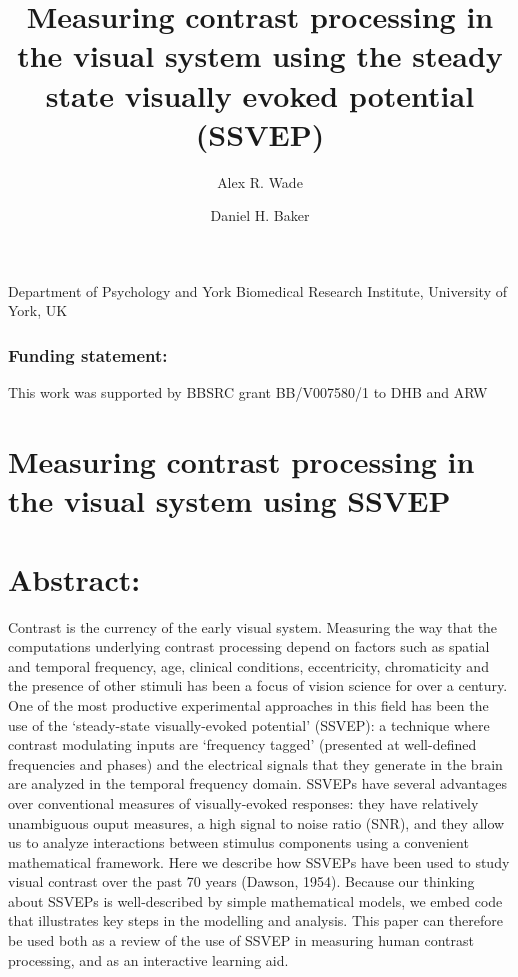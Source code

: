 \documentclass[
  letterpaper,
  DIV=11,
  numbers=noendperiod]{scrartcl}
\title{Measuring contrast processing in the visual system using the
steady state visually evoked potential (SSVEP)}
\author{Alex R. Wade \and Daniel H. Baker}
\date{}
\begin{document}
\maketitle

Department of Psychology and York Biomedical Research Institute,
University of York, UK

\subsubsection{Funding statement:}\label{funding-statement}

This work was supported by BBSRC grant BB/V007580/1 to DHB and ARW

\newpage{}

\section{Measuring contrast processing in the visual system using
SSVEP}\label{measuring-contrast-processing-in-the-visual-system-using-ssvep}

\section{Abstract:}\label{abstract}

Contrast is the currency of the early visual system. Measuring the way
that the computations underlying contrast processing depend on factors
such as spatial and temporal frequency, age, clinical conditions,
eccentricity, chromaticity and the presence of other stimuli has been a
focus of vision science for over a century. One of the most productive
experimental approaches in this field has been the use of the
`steady-state visually-evoked potential' (SSVEP): a technique where
contrast modulating inputs are `frequency tagged' (presented at
well-defined frequencies and phases) and the electrical signals that
they generate in the brain are analyzed in the temporal frequency
domain. SSVEPs have several advantages over conventional measures of
visually-evoked responses: they have relatively unambiguous ouput
measures, a high signal to noise ratio (SNR), and they allow us to
analyze interactions between stimulus components using a convenient
mathematical framework. Here we describe how SSVEPs have been used to
study visual contrast over the past 70 years (Dawson, 1954). Because our
thinking about SSVEPs is well-described by simple mathematical models,
we embed code that illustrates key steps in the modelling and analysis.
This paper can therefore be used both as a review of the use of SSVEP in
measuring human contrast processing, and as an interactive learning aid.
\end{document}
